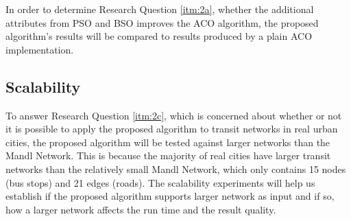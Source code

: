 In order to determine Research Question \vref{itm:2a}, whether the additional attributes from PSO and BSO improves the ACO algorithm, the proposed algorithm's results will be compared to results produced by a plain ACO implementation. 

\subsection{Scalability}
To answer Research Question \vref{itm:2c}, which is concerned about whether or not it is possible to apply the proposed algorithm to transit networks in real urban cities, the proposed algorithm will be tested against larger networks than the Mandl Network. This is because the majority of real cities have larger transit networks than the relatively small Mandl Network, which only contains 15 nodes (bus stops) and 21 edges (roads). The scalability experiments will help us establish if the proposed algorithm supports larger network as input and if so, how a larger network affects the run time and the result quality. 





